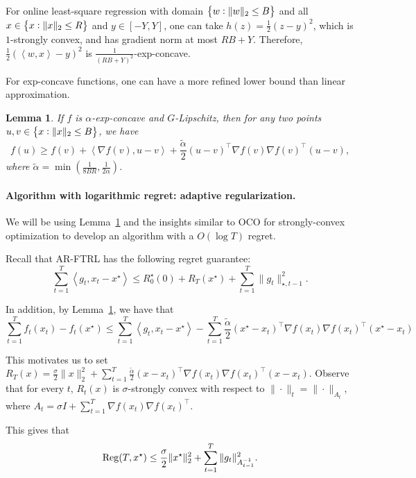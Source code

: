 \documentclass{article}
\newtheorem{lemma}{Lemma}
\DeclareMathOperator*{\Reg}{{\rm Reg}}
\newcommand{\inner}[2]{\left\langle #1,#2 \right\rangle}
\begin{document}
For online least-square regression with domain $\cbr{w: \| w\|_2 \leq B}$ and all $x \in \cbr{x: \| x \|_2 \leq R}$ and $y \in [-Y, Y]$,
one can take $h(z) = \frac12(z - y)^2$, which is $1$-strongly convex, and has gradient norm at most $RB+Y$. Therefore, $\frac12(\inner{w}{x}-y)^2$ is $\frac{1}{(RB+Y)^2}$-exp-concave.

For exp-concave functions, one can have a more refined lower bound than linear approximation.
\begin{lemma}
If $f$ is $\alpha$-exp-concave and $G$-Lipschitz,
then for any two points $u, v \in \cbr{x: \| x \|_2 \leq B}$, we have
\[ f(u) \geq f(v) + \inner{\nabla f(v)}{u - v} + \frac{\tilde{\alpha}}{2}(u - v)^\top \nabla f(v) \nabla f(v)^\top (u - v), \]
where $\tilde{\alpha} = \min(\frac{1}{8BR}, \frac{1}{2\alpha})$.
\label{lem:quad-approx}
\end{lemma}

\paragraph{Algorithm with logarithmic regret: adaptive regularization.} We will be using Lemma~\ref{lem:quad-approx} and the insights similar to OCO for strongly-convex optimization to develop an algorithm with a $O(\log T)$ regret.

Recall that AR-FTRL has the following regret guarantee:
\[ \sum_{t=1}^T \inner{g_t}{x_t - x^\star} \leq R_0^\star(0) + R_T(x^\star) + \sum_{t=1}^T \| g_t \|_{\star, t-1}^2. \]

In addition, by Lemma~\ref{lem:quad-approx}, we have that
\[ \sum_{t=1}^T f_t(x_t) - f_t(x^\star) \leq \sum_{t=1}^T \inner{g_t}{x_t - x^\star} -  \sum_{t=1}^T \frac{\tilde{\alpha}}{2}(x^\star - x_t)^\top \nabla f(x_t) \nabla f(x_t)^\top (x^\star - x_t) \]

This motivates us to set $R_T(x) = \frac\sigma2 \|x\|_2^2 + \sum_{t=1}^T \frac{\tilde{\alpha}}{2}(x - x_t)^\top \nabla f(x_t) \nabla f(x_t)^\top (x - x_t)$. Observe that for every $t$, $R_t(x)$ is $\sigma$-strongly convex with respect to $\| \cdot \|_t = \| \cdot \|_{A_t}$, where $A_t = \sigma I + \sum_{t=1}^T \nabla f(x_t) \nabla f(x_t)^\top$.

This gives that
\[ \Reg(T, x^\star) \leq \frac\sigma2 \|x^\star\|_2^2 + \sum_{t=1}^T \| g_t \|_{A_{t-1}^{-1}}^2. \]



\end{document}
